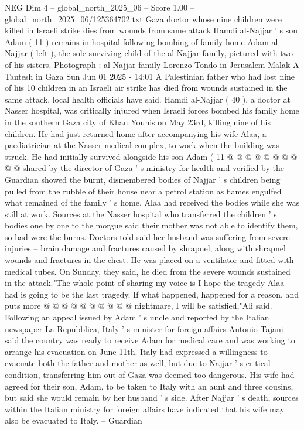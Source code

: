 \begin{textsample}{NEG Dim 4 – global\_north\_2025\_06 – Score 1.00 – global\_north\_2025\_06/125364702.txt}  \label{ex:f4_neg_065}
Gaza doctor whose nine children were killed in Israeli strike dies from wounds from same attack Hamdi al-Najjar ' s son Adam ( 11 ) remains in hospital following bombing of family home Adam al-Najjar ( left ), the sole surviving child of the al-Najjar family, pictured with two of his sisters.
Photograph : al-Najjar family Lorenzo Tondo in Jerusalem Malak A Tantesh in Gaza Sun Jun 01 2025 - 14:01 A Palestinian father who had lost nine of his 10 children in an Israeli air strike has died from wounds sustained in the same attack, local health officials have said.
Hamdi al-Najjar ( 40 ), a doctor at Nasser hospital, was critically injured when Israeli forces bombed his family home in the southern Gaza city of Khan Younis on May 23rd, killing nine of his children.
He had just returned home after accompanying his wife Alaa, a paediatrician at the Nasser medical complex, to work when the building was struck.
He had initially survived alongside his son Adam ( 11 @ @ @ @ @ @ @ @ @ @ shared by the director of Gaza ' s ministry for health and verified by the Guardian showed the burnt, dismembered bodies of Najjar ' s children being pulled from the rubble of their house near a petrol station as flames engulfed what remained of the family ' s home.
Alaa had received the bodies while she was still at work.
Sources at the Nasser hospital who transferred the children ' s bodies one by one to the morgue said their mother was not able to identify them, so bad were the burns.
Doctors told said her husband was suffering from severe injuries -- brain damage and fractures caused by shrapnel, along with shrapnel wounds and fractures in the chest.
He was placed on a ventilator and fitted with medical tubes.
On Sunday, they said, he died from the severe wounds sustained in the attack."The whole point of sharing my voice is I hope the tragedy Alaa had is going to be the last tragedy.
If what happened, happened for a reason, and puts more @ @ @ @ @ @ @ @ @ @ nightmare, I will be satisfied,"Ali said.
Following an appeal issued by Adam ' s uncle and reported by the Italian newspaper La Repubblica, Italy ' s minister for foreign affairs Antonio Tajani said the country was ready to receive Adam for medical care and was working to arrange his evacuation on June 11th.
Italy had expressed a willingness to evacuate both the father and mother as well, but due to Najjar ' s critical condition, transferring him out of Gaza was deemed too dangerous.
His wife had agreed for their son, Adam, to be taken to Italy with an aunt and three cousins, but said she would remain by her husband ' s side.
After Najjar ' s death, sources within the Italian ministry for foreign affairs have indicated that his wife may also be evacuated to Italy. -- Guardian

\end{textsample}
